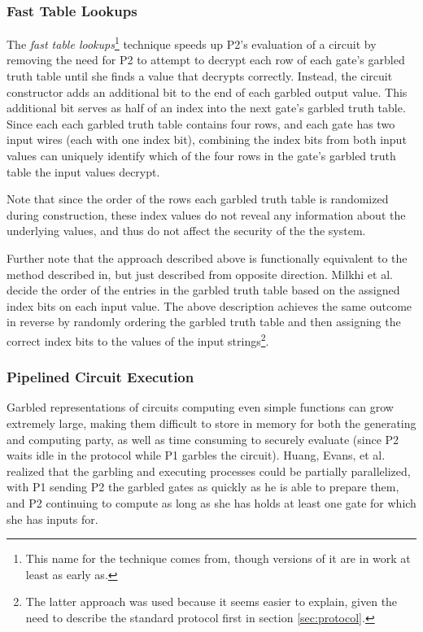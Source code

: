 \subsubsection{Fast Table Lookups}

The \emph{fast table lookups}\footnote{This name for the technique comes from\cite{huang2011faster}, though versions of it are in work at least as early as\cite{malkhi2004fairplay}.} technique speeds up \ac{P2}'s evaluation of a circuit by removing the need for \ac{P2} to attempt to decrypt each row of each gate's garbled truth table until she finds a value that decrypts correctly.  Instead, the circuit constructor adds an additional bit to the end of each garbled output value. This additional bit serves as half of an index into the next gate's garbled truth table. Since each each garbled truth table contains four rows, and each gate has two input wires (each with one index bit), combining the index bits from both input values can uniquely identify which of the four rows in the gate's garbled truth table the input values decrypt.

Note that since the order of the rows each garbled truth table is randomized during construction, these index values do not reveal any information about the underlying values, and thus do not affect the security of the the system.

Further note that the approach described above is functionally equivalent to the method described in\cite{malkhi2004fairplay}, but just described from opposite direction.  Milkhi et al. decide the order of the entries in the garbled truth table based on the assigned index bits on each input value.  The above description achieves the same outcome in reverse by randomly ordering the garbled truth table and then assigning the correct index bits to the values of the input strings\footnote{The latter approach was used because it seems easier to explain, given the need to describe the standard protocol first in section \ref{sec:protocol}.}.

\subsubsection{Pipelined Circuit Execution}
\label{sec:piplinedexecution}

Garbled representations of circuits computing even simple functions can grow extremely large, making them difficult to store in memory for both the generating and computing party, as well as time consuming to securely evaluate (since \ac{P2} waits idle in the protocol while \ac{P1} garbles the circuit).  Huang, Evans, et al.\cite{huang2011faster} realized that the garbling and executing processes could be partially parallelized, with \ac{P1} sending \ac{P2} the garbled gates as quickly as he is able to prepare them, and \ac{P2} continuing to compute as long as she has holds at least one gate for which she has inputs for.

